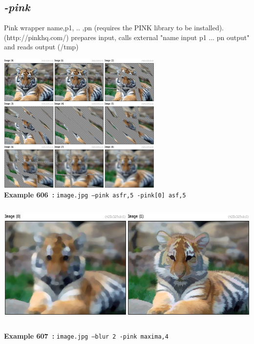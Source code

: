 \documentclass[a4paper,11pt,twoside]{book}
\begin{document}
\subsection{\emph{-pink} }\vspace*{-0.5em}
Pink wrapper name,p1, .. ,pn (requires the PINK library to be installed).
~\\(http://pinkhq.com/)
prepares input, calls external "name input p1 ... pn output" and reads output (/tmp)
\begin{center}\includegraphics[keepaspectratio=true,height=7cm,width=\textwidth]{img/gmic_def606.jpg}\\
{\footnotesize \textbf{Example 606~:} \texttt{image.jpg --pink asfr,5 -pink[0] asf,5}}
\\\includegraphics[keepaspectratio=true,height=7cm,width=\textwidth]{img/gmic_def607.jpg}\\
{\footnotesize \textbf{Example 607~:} \texttt{image.jpg --blur 2 -pink maxima,4}}
\end{center}
\end{document}
